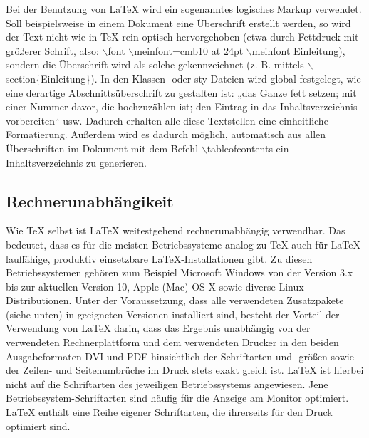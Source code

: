Bei der Benutzung von LaTeX wird ein sogenanntes logisches Markup verwendet. Soll beispielsweise in einem Dokument eine Überschrift erstellt werden, so wird der Text nicht wie in TeX rein optisch hervorgehoben (etwa durch Fettdruck mit größerer Schrift, also: \colorbox{black!8}{$\backslash$font $\backslash$meinfont=cmb10 at 24pt $\backslash$meinfont Einleitung}), sondern die Überschrift wird als solche gekennzeichnet (z. B. mittels \colorbox{black!8}{$\backslash$section\{Einleitung\}}). In den Klassen- oder sty-Dateien wird global festgelegt, wie eine derartige Abschnittsüberschrift zu gestalten ist: „das Ganze fett setzen; mit einer Nummer davor, die hochzuzählen ist; den Eintrag in das Inhaltsverzeichnis vorbereiten“ usw. Dadurch erhalten alle diese Textstellen eine einheitliche Formatierung. Außerdem wird es dadurch möglich, automatisch aus allen Überschriften im Dokument mit dem Befehl \colorbox{black!8}{$\backslash$tableofcontents} ein Inhaltsverzeichnis zu generieren.

\subsection{Rechnerunabhängikeit}

Wie TeX selbst ist LaTeX weitestgehend rechnerunabhängig verwendbar. Das bedeutet, dass es für die meisten Betriebssysteme analog zu TeX auch für LaTeX lauffähige, produktiv einsetzbare LaTeX-Installationen gibt. Zu diesen Betriebssystemen gehören zum Beispiel Microsoft Windows von der Version 3.x bis zur aktuellen Version 10, Apple (Mac) OS X sowie diverse Linux-Distributionen. Unter der Voraussetzung, dass alle verwendeten Zusatzpakete (siehe unten) in geeigneten Versionen installiert sind, besteht der Vorteil der Verwendung von LaTeX darin, dass das Ergebnis unabhängig von der verwendeten Rechnerplattform und dem verwendeten Drucker in den beiden Ausgabeformaten DVI und PDF hinsichtlich der Schriftarten und -größen sowie der Zeilen- und Seitenumbrüche im Druck stets exakt gleich ist. LaTeX ist hierbei nicht auf die Schriftarten des jeweiligen Betriebssystems angewiesen. Jene Betriebssystem-Schriftarten sind häufig für die Anzeige am Monitor optimiert. LaTeX enthält eine Reihe eigener Schriftarten, die ihrerseits für den Druck optimiert sind.

